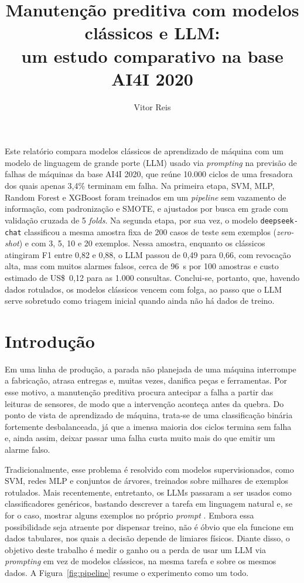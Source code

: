 \documentclass[12pt]{article}
\title{Manutenção preditiva com modelos clássicos e LLM:\\ um estudo comparativo na base AI4I 2020}
\author{Vitor Reis}
\begin{document}
\maketitle

\begin{resumo}
Este relatório compara modelos clássicos de aprendizado de máquina com um modelo de linguagem de grande porte (LLM) usado via \textit{prompting} na previsão de falhas de máquinas da base AI4I 2020, que reúne 10.000 ciclos de uma fresadora dos quais apenas 3,4\% terminam em falha. Na primeira etapa, SVM, MLP, Random Forest e XGBoost foram treinados em um \textit{pipeline} sem vazamento de informação, com padronização e SMOTE, e ajustados por busca em grade com validação cruzada de 5 \textit{folds}. Na segunda etapa, por sua vez, o modelo \texttt{deepseek-chat} classificou a mesma amostra fixa de 200 casos de teste sem exemplos (\textit{zero-shot}) e com 3, 5, 10 e 20 exemplos. Nessa amostra, enquanto os clássicos atingiram F1 entre 0,82 e 0,88, o LLM passou de 0,49 para 0,66, com revocação alta, mas com muitos alarmes falsos, cerca de 96~s por 100 amostras e custo estimado de US\$~0,12 para as 1.000 consultas. Conclui-se, portanto, que, havendo dados rotulados, os modelos clássicos vencem com folga, ao passo que o LLM serve sobretudo como triagem inicial quando ainda não há dados de treino.
\end{resumo}

\section{Introdução}

Em uma linha de produção, a parada não planejada de uma máquina interrompe a fabricação, atrasa entregas e, muitas vezes, danifica peças e ferramentas. Por esse motivo, a manutenção preditiva procura antecipar a falha a partir das leituras de sensores, de modo que a intervenção aconteça antes da quebra. Do ponto de vista de aprendizado de máquina, trata-se de uma classificação binária fortemente desbalanceada, já que a imensa maioria dos ciclos termina sem falha e, ainda assim, deixar passar uma falha custa muito mais do que emitir um alarme falso.

Tradicionalmente, esse problema é resolvido com modelos supervisionados, como SVM, redes MLP e conjuntos de árvores, treinados sobre milhares de exemplos rotulados. Mais recentemente, entretanto, os LLMs passaram a ser usados como classificadores genéricos, bastando descrever a tarefa em linguagem natural e, se for o caso, mostrar alguns exemplos no próprio \textit{prompt} \cite{brown2020,hegselmann2023}. Embora essa possibilidade seja atraente por dispensar treino, não é óbvio que ela funcione em dados tabulares, nos quais a decisão depende de limiares físicos. Diante disso, o objetivo deste trabalho é medir o ganho ou a perda de usar um LLM via \textit{prompting} em vez de modelos clássicos, na mesma tarefa e sobre os mesmos dados. A Figura~\ref{fig:pipeline} resume o experimento como um todo.
\end{document}
